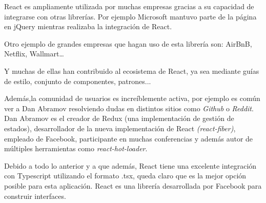 \bigskip
React es ampliamente utilizada por muchas empresas gracias a su capacidad de integrarse con otras librerías. 
Por ejemplo Microsoft mantuvo parte de la página en jQuery mientras realizaba la integración de React.

\bigskip
Otro ejemplo de grandes empresas que hagan uso de esta librería son: AirBnB, Netflix, Wallmart…  \cite{ReactUsers}

\bigskip
Y muchas de ellas han contribuido al ecosistema de React, ya sea mediante guías de estilo, conjunto de componentes, patrones... \cite{ReactStyleGuide}

\bigskip
Además,la comunidad de usuarios es increíblemente activa, por ejemplo es común ver a Dan Abramov resolviendo dudas
en distintos sitios como \textit{Github} o \textit{Reddit}. Dan Abramov es el creador de Redux (una implementación de gestión de estados), desarrollador de la nueva implementación de 
React \textit{(react-fiber)}, empleado de Facebook, participante en muchas conferencias y además autor de 
múltiples herramientas como \textit{react-hot-loader}. 

\bigskip
Debido a todo lo anterior y a que además, React tiene una excelente integración con Typescript utilizando 
el formato .tsx, queda claro que es la mejor opción posible para esta aplicación. React es una librería 
desarrollada por Facebook para construir interfaces.
